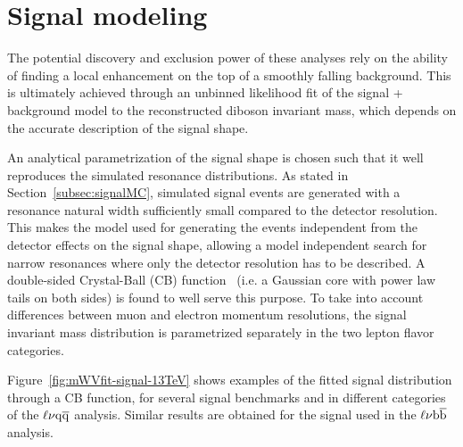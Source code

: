 \section{Signal modeling}\label{sec:signalModel}

The potential discovery and exclusion power of these analyses rely on the ability of finding a local enhancement on the top of a smoothly falling background. 
This is ultimately achieved through an unbinned likelihood fit of the signal + background model to the reconstructed diboson invariant mass, which depends on the accurate description of the signal shape.

An analytical parametrization of the signal shape is chosen such that it well reproduces the simulated resonance distributions.
As stated in Section~\ref{subsec:signalMC}, simulated signal events are generated with a resonance natural width sufficiently small compared to the detector resolution.
This makes the model used for generating the events independent from the detector effects on the signal shape, allowing a model independent search for narrow resonances
where only the detector resolution has to be described. A double-sided Crystal-Ball (CB) function~\cite{CrystalBallRef} (i.e. a Gaussian core with power law tails on both sides) is found to well serve this purpose.
To take into account differences between muon and electron momentum resolutions, the signal invariant mass distribution is parametrized separately in the two lepton flavor categories.

Figure~\ref{fig:mWVfit-signal-13TeV} shows examples of the fitted signal distribution through a CB function, for several signal benchmarks and in different \mJ categories of the $\ell\nu\mathrm{q}\overline{\mathrm{q}}$ analysis.
Similar results are obtained for the \Wpr signal used in the $\ell\nu{\mathrm{b}\overline{\mathrm{b}}}$ analysis.


